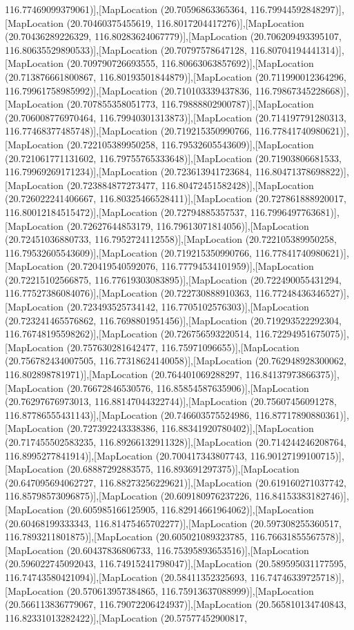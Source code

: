 116.77469099379061)],[MapLocation (20.70596863365364, 116.79944592848297)],[MapLocation (20.70460375455619, 116.8017204417276)],[MapLocation (20.70436289226329, 116.80283624067779)],[MapLocation (20.706209493395107, 116.80635529890533)],[MapLocation (20.70797578647128, 116.80704194441314)],[MapLocation (20.709790726693555, 116.80663063857692)],[MapLocation (20.713876661800867, 116.80193501844879)],[MapLocation (20.711990012364296, 116.79961758985992)],[MapLocation (20.710103339437836, 116.79867345228668)],[MapLocation (20.707855358051773, 116.79888802900787)],[MapLocation (20.706008776970464, 116.79940301313873)],[MapLocation (20.714197791280313, 116.77468377485748)],[MapLocation (20.719215350990766, 116.77841740980621)],[MapLocation (20.722105389950258, 116.79532605543609)],[MapLocation (20.721061771131602, 116.79755765333648)],[MapLocation (20.71903806681533, 116.79969269171234)],[MapLocation (20.723613941723684, 116.80471378698822)],[MapLocation (20.723884877273477, 116.80472451582428)],[MapLocation (20.726022241406667, 116.80325466528411)],[MapLocation (20.727861888920017, 116.80012184515472)],[MapLocation (20.72794885357537, 116.7996497763681)],[MapLocation (20.72627644853179, 116.79613071814056)],[MapLocation (20.72451036880733, 116.7952724112558)],[MapLocation (20.722105389950258, 116.79532605543609)],[MapLocation (20.719215350990766, 116.77841740980621)],[MapLocation (20.720419540592076, 116.77794534101959)],[MapLocation (20.72215102566875, 116.77619303083895)],[MapLocation (20.722490055431294, 116.77527386084076)],[MapLocation (20.722730888910363, 116.77248436346527)],[MapLocation (20.723493525734142, 116.7705102576303)],[MapLocation (20.723241465576862, 116.7698801951456)],[MapLocation (20.719293522292304, 116.76748195598262)],[MapLocation (20.726756593220514, 116.72294951675075)],[MapLocation (20.757630281642477, 116.75971096655)],[MapLocation (20.756782434007505, 116.77318624140058)],[MapLocation (20.762948928300062, 116.802898781971)],[MapLocation (20.764401069288297, 116.84137973866375)],[MapLocation (20.76672846530576, 116.85854587635906)],[MapLocation (20.76297676973013, 116.88147044322744)],[MapLocation (20.75607456091278, 116.87786555431143)],[MapLocation (20.746603575524986, 116.87717890880361)],[MapLocation (20.727392243338386, 116.88341920780402)],[MapLocation (20.717455502583235, 116.89266132911328)],[MapLocation (20.714244246208764, 116.8995277841914)],[MapLocation (20.700417343807743, 116.90127199100715)],[MapLocation (20.68887292883575, 116.893691297375)],[MapLocation (20.647095694062727, 116.88273256229621)],[MapLocation (20.619160271037742, 116.85798573096875)],[MapLocation (20.609180976237226, 116.84153383182746)],[MapLocation (20.605985166125905, 116.82914661964062)],[MapLocation (20.60468199333343, 116.81475465702277)],[MapLocation (20.597308255360517, 116.7893211801875)],[MapLocation (20.605021089323785, 116.76631855567578)],[MapLocation (20.60437836806733, 116.75395893653516)],[MapLocation (20.596022745092043, 116.74915241798047)],[MapLocation (20.589595031177595, 116.74743580421094)],[MapLocation (20.58411352325693, 116.74746339725718)],[MapLocation (20.570613957384865, 116.75913637088999)],[MapLocation (20.566113836779067, 116.79072206424937)],[MapLocation (20.565810134740843, 116.82331013282422)],[MapLocation (20.57577452900817, 